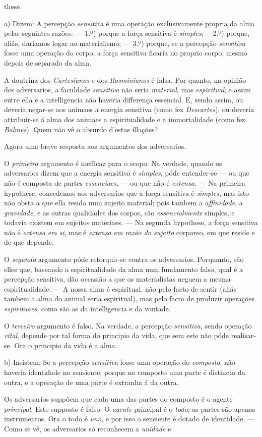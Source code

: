 these.\par a) Dizem: A percepção \emph{sensitiva} é uma operação exclusivamente propria da alma pelas seguintes razões: --- 1.º) porque a força sensitiva é \emph{simples};--- 2.º) porque, aliás, dariamos logar ao materialismo; --- 3.º) porque, se a percepção \emph{sensitiva} fosse uma operação do corpo, a força sensitiva ficaria no proprio corpo, mesmo depois de separado da alma.\par A doutrina dos \emph{Cartesianos} e dos \emph{Rosminianos} é falsa. Por quanto, na opinião dos adversarios, a faculdade \emph{sensitiva} não seria \emph{material}, mas \emph{espiritual}; e assim entre ella e a intelligencia não haveria differença essencial. E, sendo assim, ou deveria negar-se aos animaes a energia sensitiva (como fez \emph{Descartes}), ou deveria attribuir-se á alma dos animaes a espiritualidade e a immortalidade (como fez \emph{Balmes}). Quem não vê o absurdo d'estas illações?\par Agora uma breve resposta aos argumentos dos adversarios.\par O \emph{primeiro} argumento é inefficaz para o scopo. Na verdade, quando os adversarios dizem que a energia sensitiva é \emph{simples}, póde entender-se --- ou que não é composta de partes \emph{essenciaes}, --- ou que não é \emph{extensa}. --- Na primeira hypothese, concedemos aos adversarios que a força sensitiva é \emph{simples}, mas isto não obsta a que ella resida num sujeito material; pois tambem a \emph{affinidade}, a \emph{gravidade}, e as outras qualidades dos corpos, são \emph{essencialmente} simples, e todavia existem em sujeitos materiaes. --- Na segunda hypothese, a força sensitiva não é \emph{extensa} \emph{em si}, mas é \emph{extensa} \emph{em razão do sujeito} corporeo, em que reside e de que depende.\par O \emph{segundo} argumento póde retorquir-se contra os adversarios. Porquanto, são elles que, baseando a espiritualidade da alma num fundamento falso, qual é a percepção sensitiva, dão occasião a que os materialistas neguem a mesma espiritualidade. --- A nossa alma é espiritual, não pelo facto de sentir (aliás tambem a alma do animal seria espiritual), mas pelo facto de produzir operações \emph{espirituaes}, como são as da intelligencia e da vontade.\par O \emph{terceiro} argumento é falso. Na verdade, a percepção \emph{sensitiva}, sendo operação \emph{vital}, depende por tal forma do principio da vida, que sem este não póde realisar-se. Ora o principio da vida é a alma.\par b) Insistem: Se a percepção \emph{sensitiva} fosse uma operação do \emph{composto}, não haveria identidade no sensiente; porque no composto uma parte é distincta da outra, e a operação de uma parte é extranha á da outra.\par Os adversarios suppõem que cada uma das partes do composto é o agente \emph{principal}. Este supposto é falso. O \emph{agente} principal é o \emph{todo}; as partes são apenas instrumentos. Ora o todo é \emph{uno}, e por isso o sensiente é dotado de identidade. --- Como se vê, os adversarios só reconhecem a \emph{unidade} e 